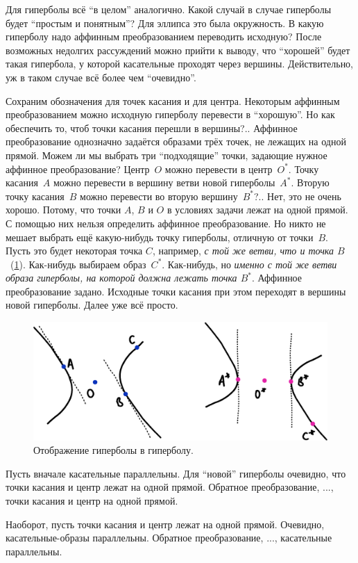 \documentclass[a4paper,12pt]{article}
\begin{document}
\begin{solution}
    Для гиперболы всё ``в целом'' аналогично.
    Какой случай в случае гиперболы будет ``простым и понятным''?
    Для эллипса это была окружность.
    В какую гиперболу надо аффинным преобразованием переводить исходную?
    После возможных недолгих рассуждений можно прийти к выводу, что ``хорошей'' будет такая гипербола, у которой касательные проходят через вершины.
    Действительно, уж в таком случае всё более чем ``очевидно''.
    
    Сохраним обозначения для точек касания и для центра.
    Некоторым аффинным преобразованием можно исходную гиперболу перевести в ``хорошую''.
    Но как обеспечить то, чтоб точки касания перешли в вершины?..
    Аффинное преобразование однозначно задаётся образами трёх точек, не лежащих на одной прямой.
    Можем ли мы выбрать три ``подходящие'' точки, задающие нужное аффинное преобразование?
    Центр~$O$ можно перевести в центр~$O^*$.
    Точку касания~$A$ можно перевести в вершину ветви новой гиперболы~$A^*$.
    Вторую точку касания~$B$ можно перевести во вторую вершину~$B^*$?..
    Нет, это не очень хорошо.
    Потому, что точки $A$, $B$ и $O$ в условиях задачи лежат на одной прямой.
    С помощью них нельзя определить аффинное преобразование.
    Но никто не мешает выбрать ещё какую-нибудь точку гиперболы, отличную от точки~$B$.
    Пусть это будет некоторая точка $C$, например, \emph{с той же ветви, что и точка $B$}~(\ref{fig:from-hyperbola-to-hyperbola}).
    Как-нибудь выбираем образ~$C^*$.
    Как-нибудь, но \emph{именно с той же ветви образа гиперболы, на которой должна лежать точка $B^*$}.
    Аффинное преобразование задано.
    Исходные точки касания при этом переходят в вершины новой гиперболы.
    Далее уже всё просто.
    
    \begin{figure}
      \centering
      
      \includegraphics[width=0.8\columnwidth]{from-hyperbola-to-hyperbola}
      
      \caption{Отображение гиперболы в гиперболу.}  %
      \label{fig:from-hyperbola-to-hyperbola}
    \end{figure}
    
    Пусть вначале касательные параллельны.
    Для ``новой'' гиперболы очевидно, что точки касания и центр лежат на одной прямой.
    Обратное преобразование, ..., точки касания и центр на одной прямой.
    
    Наоборот, пусть точки касания и центр лежат на одной прямой.
    Очевидно, касательные-образы параллельны.
    Обратное преобразование, ..., касательные параллельны.
  \end{solution}
\end{document}
